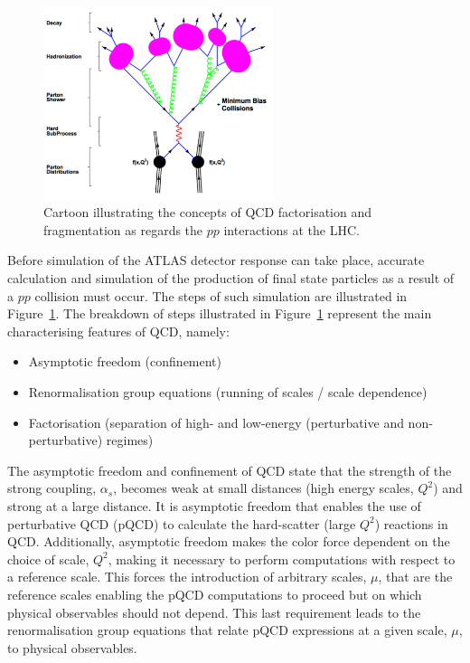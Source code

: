 \begin{figure}[!htb]
    \begin{center}
        \includegraphics[width=0.6\textwidth]{figures/event_simulation/pp_simulation_steps}
        \caption{
            Cartoon illustrating the concepts of QCD factorisation and fragmentation as regards
            the $pp$ interactions at the LHC.
            {\color{red}{redo this figure}}
        }
        \label{fig:pp_sim_steps}
    \end{center}
\end{figure}

Before simulation of the ATLAS detector response can take place, accurate calculation and simulation of the production of final
state particles as a result of a $pp$ collision must occur.
The steps of such simulation are illustrated in Figure~\ref{fig:pp_sim_steps}.
The breakdown of steps illustrated in Figure~\ref{fig:pp_sim_steps} represent the main characterising features
of QCD, namely: 
\begin{itemize}
    \item Asymptotic freedom (confinement)
    \item Renormalisation group equations (running of scales / scale dependence)
    \item Factorisation (separation of high- and low-energy (perturbative and non-perturbative) regimes)
\end{itemize}

The asymptotic freedom and confinement of QCD state that the strength of the strong coupling, $\alpha_s$, becomes weak at
small distances (high energy scales, $Q^2$) and strong at a large distance.
It is asymptotic freedom that enables the use of perturbative QCD (pQCD) to calculate the hard-scatter (large $Q^2$)
reactions in QCD. Additionally, asymptotic freedom makes the color force dependent on the choice of scale, $Q^2$,
making it necessary to perform computations with respect to a reference scale.
This forces the introduction of arbitrary scales, $\mu$, that are the reference scales enabling the pQCD computations
to proceed but on which physical observables should not depend.
This last requirement leads to the renormalisation group equations that relate pQCD expressions at a given
scale, $\mu$, to physical observables.

